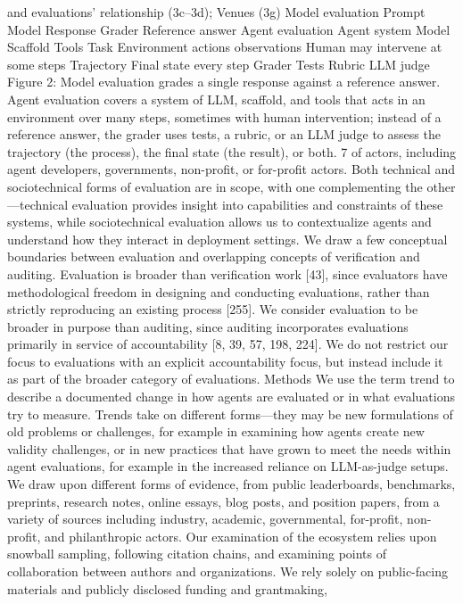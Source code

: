 and evaluations’
relationship (3c–3d); Venues (3g)
Model evaluation
Prompt
Model
Response
Grader
Reference answer
Agent evaluation
Agent system
Model
Scaffold
Tools
Task
Environment
actions
observations
Human
may intervene
at some steps
Trajectory
Final state
every step
Grader
Tests
Rubric
LLM judge
Figure 2: Model evaluation grades a single response against a reference answer. Agent evaluation covers a system of
LLM, scaffold, and tools that acts in an environment over many steps, sometimes with human intervention; instead of
a reference answer, the grader uses tests, a rubric, or an LLM judge to assess the trajectory (the process), the final
state (the result), or both.
7
of actors, including agent developers, governments, non-profit, or for-profit actors. Both technical and
sociotechnical forms of evaluation are in scope, with one complementing the other—technical evaluation
provides insight into capabilities and constraints of these systems, while sociotechnical evaluation allows us
to contextualize agents and understand how they interact in deployment settings.
We draw a few conceptual boundaries between evaluation and overlapping concepts of verification and
auditing. Evaluation is broader than verification work [43], since evaluators have methodological freedom
in designing and conducting evaluations, rather than strictly reproducing an existing process [255]. We
consider evaluation to be broader in purpose than auditing, since auditing incorporates evaluations primarily
in service of accountability [8, 39, 57, 198, 224]. We do not restrict our focus to evaluations with an
explicit accountability focus, but instead include it as part of the broader category of evaluations.
Methods
We use the term trend to describe a documented change in how agents are evaluated or in what evaluations
try to measure. Trends take on different forms—they may be new formulations of old problems or challenges,
for example in examining how agents create new validity challenges, or in new practices that have grown
to meet the needs within agent evaluations, for example in the increased reliance on LLM-as-judge setups.
We draw upon different forms of evidence, from public leaderboards, benchmarks, preprints, research
notes, online essays, blog posts, and position papers, from a variety of sources including industry, academic,
governmental, for-profit, non-profit, and philanthropic actors. Our examination of the ecosystem relies upon
snowball sampling, following citation chains, and examining points of collaboration between authors and
organizations. We rely solely on public-facing materials and publicly disclosed funding and grantmaking,
